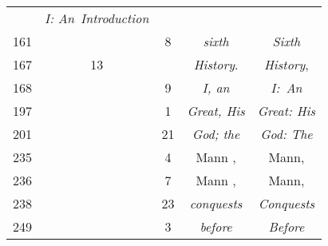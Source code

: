 \documentclass[a4paper,11pt]{article}
\numberwithin{equation}{section}
\begin{document}
\begin{center}
\begin{tabular}{|c|c|c|c|c|}
           & \textit{I: An~Introduction} \\
    161 & & \hphantom{0}8 & \textit{sixth} & \textit{Sixth} \\
    167 & 13 & & \textit{History}. & \textit{History}, \\
    168 & & \hphantom{0}9 & \textit{I, an} & \textit{I:~An} \\
    197 & & \hphantom{0}1 & \textit{Great, His} & \textit{Great: His} \\
    201 & & 21 & \textit{God; the} & \textit{God: The} \\
    235 & & \hphantom{0}4 & Mann , & Mann, \\
    236 & & \hphantom{0}7 & Mann , & Mann, \\
    238 & & 23 & \textit{conquests} & \textit{Conquests} \\
    249 & & \hphantom{0}3 & \textit{before} & \textit{Before} \\
    \hline
  \end{tabular}





  \newpage


\end{center}
\end{document}
